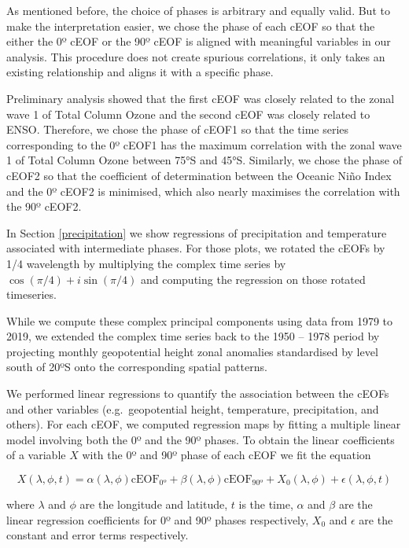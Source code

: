\documentclass[pdflatex,sn-basic]{sn-jnl}
\theoremstyle{thmstyleone}%
\theoremstyle{thmstyletwo}%
\theoremstyle{thmstylethree}%
\begin{document}
As mentioned before, the choice of phases is arbitrary and equally valid.
But to make the interpretation easier, we chose the phase of each cEOF so that the either the 0º cEOF or the 90º cEOF is aligned with meaningful variables in our analysis.
This procedure does not create spurious correlations, it only takes an existing relationship and aligns it with a specific phase.

Preliminary analysis showed that the first cEOF was closely related to the zonal wave 1 of Total Column Ozone and the second cEOF was closely related to ENSO.
Therefore, we chose the phase of cEOF1 so that the time series corresponding to the 0º cEOF1 has the maximum correlation with the zonal wave 1 of Total Column Ozone between 75°S and 45°S.
Similarly, we chose the phase of cEOF2 so that the coefficient of determination between the Oceanic Niño Index \citep{bamston1997} and the 0º cEOF2 is minimised, which also nearly maximises the correlation with the 90º cEOF2.

In Section \ref{precipitation} we show regressions of precipitation and temperature associated with intermediate phases.
For those plots, we rotated the cEOFs by 1/4 wavelength by multiplying the complex time series by \(\cos(\pi/4) + i\sin(\pi/4)\) and computing the regression on those rotated timeseries.

While we compute these complex principal components using data from 1979 to 2019, we extended the complex time series back to the 1950 -- 1978 period by projecting monthly geopotential height zonal anomalies standardised by level south of 20ºS onto the corresponding spatial patterns.

We performed linear regressions to quantify the association between the cEOFs and other variables (e.g.~geopotential height, temperature, precipitation, and others).
For each cEOF, we computed regression maps by fitting a multiple linear model involving both the 0º and the 90º phases.
To obtain the linear coefficients of a variable \(X\) with the 0º and 90º phase of each cEOF we fit the equation

\[
X(\lambda, \phi, t) = \alpha(\lambda, \phi) \operatorname{cEOF_{0º}} + \beta(\lambda, \phi) \operatorname{cEOF_{90º}} + X_0(\lambda, \phi) + \epsilon(\lambda, \phi, t)
\]

where \(\lambda\) and \(\phi\) are the longitude and latitude, \(t\) is the time, \(\alpha\) and \(\beta\) are the linear regression coefficients for 0º and 90º phases respectively, \(X_0\) and \(\epsilon\) are the constant and error terms respectively.
\end{document}
